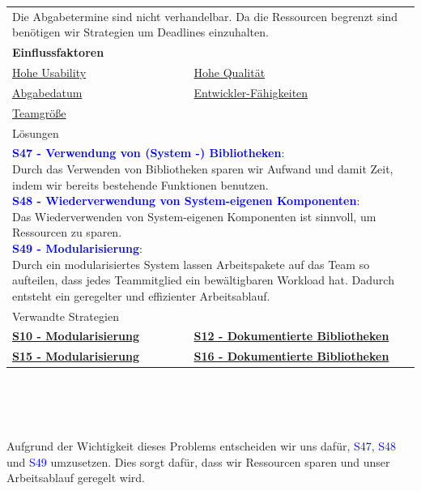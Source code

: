 \documentclass[enabledeprecatedfontcommands,fontsize=11pt,paper=a4,twoside]{scrartcl}
\newcounter{one}
\newcommand{\cb}[1]{{\textcolor{blue}{#1}}}
\begin{document}
	\newpage
	\begin{tabular} {|p{8cm} p{8cm}|}
		\hline
		\rowcolor{prob}\multicolumn{2}{|l|}{\parbox{16cm}{\textbf{19: Einhaltung der Abgabetermine}}} \\  \hline\hline 
		\multicolumn{2}{|l|}{\parbox{16cm}{Die Abgabetermine sind nicht verhandelbar. Da die Ressourcen begrenzt sind benötigen wir Strategien um Deadlines einzuhalten.}}\rule{0pt}{4ex}\\ [1ex] \hline
		\multicolumn{2}{|l|}{\textbf{Einflussfaktoren}}\\
		\hyperlink {g}{Hohe Usability}&
		\hyperlink {h}{Hohe Qualität}\\
		\hyperlink {uu}{Abgabedatum} &
		\hyperlink {vv}{Entwickler-Fähigkeiten} \\
		\hyperlink {xx}{Teamgröße} &
		\\ \hline
		\multicolumn{2}{|l|}{Lösungen} \\
		\multicolumn{2}{|l|}{\parbox{16cm}{
				\textbf{\cb{\hypertarget{qqq}{S47 - Verwendung von (System -) Bibliotheken}}}: \\
				Durch das Verwenden von Bibliotheken sparen wir Aufwand und damit Zeit, indem wir bereits bestehende Funktionen benutzen. \\
				\textbf{\cb{\hypertarget{aaab}{S48 - Wiederverwendung von System-eigenen Komponenten}}}: \\
				Das Wiederverwenden von System-eigenen Komponenten ist sinnvoll, um Ressourcen zu sparen. \\
				\textbf{\cb{\hypertarget{aaaa}{S49 - Modularisierung}}}: \\
				Durch ein modularisiertes System lassen Arbeitspakete auf das Team so aufteilen, dass jedes Teammitglied ein bewältigbaren Workload hat. Dadurch entsteht ein geregelter und effizienter Arbeitsablauf. \\
		} }\\ [6ex] \hline
		\multicolumn{2}{|l|}{Verwandte Strategien} \\
		\textbf{\hyperlink{aadd}{S10 - Modularisierung}}&
		\textbf{\hyperlink{aaaf}{S12 - Dokumentierte Bibliotheken}}\\
		\textbf{\hyperlink{aabb}{S15 - Modularisierung}}&
		\textbf{\hyperlink{ddd}{S16 - Dokumentierte Bibliotheken}}
		\\\hline
	\end{tabular}\\ \\ \\
	\begin{onehalfspace}
		Aufgrund der Wichtigkeit dieses Problems entscheiden wir uns dafür, \cb{S47}, \cb{S48} und \cb{S49} umzusetzen. Dies sorgt dafür, dass wir Ressourcen sparen und unser Arbeitsablauf geregelt wird.
	\end{onehalfspace}
	
\end{document}
